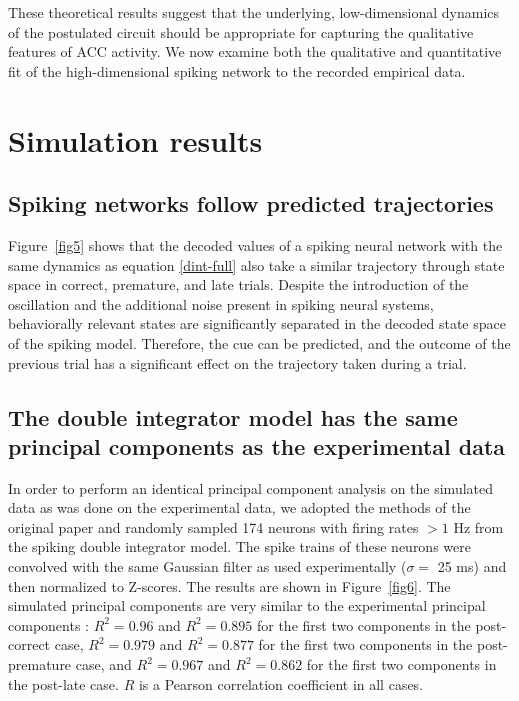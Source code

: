 \documentclass[11pt]{article}
\begin{document}
These theoretical results suggest that
the underlying, low-dimensional dynamics
of the postulated circuit
should be appropriate
for capturing the qualitative features of ACC activity.
We now examine
both the qualitative and quantitative fit
of the high-dimensional spiking network
to the recorded empirical data.

\section{Simulation results}

\subsection{Spiking networks follow predicted trajectories}

Figure~\ref{fig5} shows that
the decoded values of a spiking neural network
with the same dynamics as equation \eqref{dint-full}
also take a similar trajectory through
state space in correct, premature, and late trials.
Despite the introduction of the oscillation
and the additional noise present
in spiking neural systems,
behaviorally relevant states
are significantly separated
in the decoded state space of the spiking model.
Therefore, the cue can be predicted,
and the outcome of the previous trial
has a significant effect
on the trajectory taken during a trial.

\subsection{The double integrator model has the same principal components as the experimental data}

In order to perform an identical
principal component analysis
on the simulated data as was done
on the experimental data,
we adopted the methods of the original paper
and randomly sampled 174 neurons
with firing rates $> 1$ Hz from
the spiking double integrator model.
The spike trains of these neurons
were convolved with the same Gaussian filter
as used experimentally
($\sigma = $ 25 ms)
and then normalized to Z-scores.
The results are shown in Figure~\ref{fig6}.
The simulated principal components
are very similar to the experimental principal components
\cite{Narayanan2009}:
$R^2 = 0.96$ and $R^2 = 0.895$ for
the first two components in the post-correct case,
$R^2 = 0.979$ and $R^2 = 0.877$ for
the first two components in the post-premature case,
and $R^2 = 0.967$ and $R^2 = 0.862$ for
the first two components in the post-late case.
$R$ is a Pearson correlation coefficient in all cases.
\end{document}
